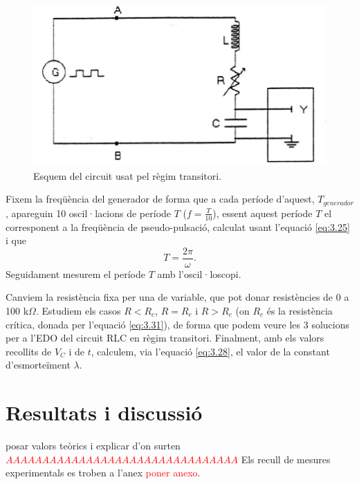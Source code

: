\documentclass[a4paper,10.5pt]{report}
\begin{document}
\begin{figure}[h]
	\centering
	\includegraphics[width=0.5\linewidth]{screenshot006}
	\caption{Esquem del circuit usat pel règim transitori.}
	\label{fig:3.3}
\end{figure}

Fixem la freqüència del generador de forma que a cada període d'aquest, $T_{generador}$, apareguin 10 oscil·lacions de període $T$ ($f = \frac{T}{10}$), essent aquest període $T$ el corresponent a la freqüència de pseudo-pulsació, calculat usant l'equació \eqref{eq:3.25} i que
\begin{equation}
	T = \frac{2\pi}{\omega}.
\end{equation}
Seguidament mesurem el període $T$ amb l'oscil·loscopi. 

Canviem la resistència fixa per una de variable, que pot donar resistències de 0 a 100 k$\Omega$. Estudiem els casos $R<R_c$, $R=R_c$ i $R>R_c$ (on $R_c$ és la resistència crítica, donada per l'equació \eqref{eq:3.31}), de forma que podem veure les 3 solucions per a l'EDO del circuit RLC en règim transitori. Finalment, amb els valors recollits de $V_C$ i de $t$, calculem, via l'equació \eqref{eq:3.28}, el valor de la constant d'esmorteïment $\lambda$.
\section{Resultats i discussió}
posar valors teòrics i explicar d'on surten\\
\textcolor{red}{$AAAAAAAAAAAAAAAAAAAAAAAAAAAAAAAA$}
Els recull de mesures experimentals es troben a l'anex \textcolor{red}{poner anexo}. 
\end{document}
